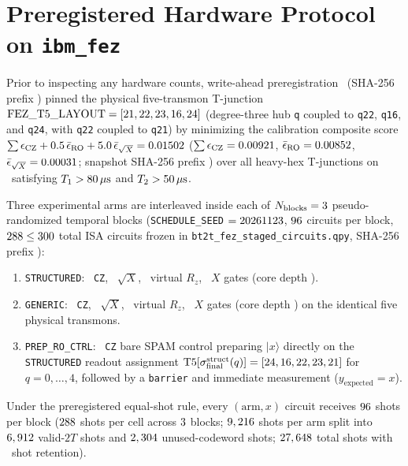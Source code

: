 \documentclass[aps,prx,twocolumn,superscriptaddress,nofootinbib]{revtex4-2}
\begin{document}
\section{Preregistered Hardware Protocol on \texttt{ibm\_fez}}
Prior to inspecting any hardware counts, write-ahead preregistration \btProtocolId\ (SHA-256 prefix \btPreregSha) pinned the physical five-transmon T-junction $\mathrm{FEZ\_T5\_LAYOUT} = [21, 22, 23, 16, 24]$ (degree-three hub \texttt{q\btHubQubit} coupled to \texttt{q22}, \texttt{q16}, and \texttt{q24}, with \texttt{q22} coupled to \texttt{q21}) by minimizing the calibration composite score $\sum \epsilon_{\mathrm{CZ}} + 0.5\,\bar{\epsilon}_{\mathrm{RO}} + 5.0\,\bar{\epsilon}_{\sqrt{X}} = 0.01502$ ($\sum \epsilon_{\mathrm{CZ}} = 0.00921$, $\bar{\epsilon}_{\mathrm{RO}} = 0.00852$, $\bar{\epsilon}_{\sqrt{X}} = 0.00031$; snapshot SHA-256 prefix \btCalSnapSha) over all heavy-hex T-junctions on \btBackend\ satisfying $T_1 > 80\,\mu\mathrm{s}$ and $T_2 > 50\,\mu\mathrm{s}$.

Three experimental arms are interleaved inside each of $N_{\mathrm{blocks}} = 3$ pseudo-randomized temporal blocks (\texttt{SCHEDULE\_SEED} $= 20261123$, $96$ circuits per block, $288 \le 300$ total ISA circuits frozen in \texttt{bt2t\_fez\_staged\_circuits.qpy}, SHA-256 prefix \btQpySha):
\begin{enumerate}
  \item \texttt{STRUCTURED}: \btStructCz\ \texttt{CZ}, \btStructSx\ $\sqrt{X}$, \btStructRz\ virtual $R_z$, \btStructX\ $X$ gates (core depth \btStructDepth).
  \item \texttt{GENERIC}: \btGenCz\ \texttt{CZ}, \btGenSx\ $\sqrt{X}$, \btGenRz\ virtual $R_z$, \btGenX\ $X$ gates (core depth \btGenDepth) on the identical five physical transmons.
  \item \texttt{PREP\_RO\_CTRL}: \btCtrlCz\ \texttt{CZ} bare SPAM control preparing $|x\rangle$ directly on the \texttt{STRUCTURED} readout assignment $\mathrm{T5}[\sigma_{\mathrm{final}}^{\mathrm{struct}}(q)] = [24, 16, 22, 23, 21]$ for $q = 0,\dots,4$, followed by a \texttt{barrier} and immediate measurement ($y_{\mathrm{expected}} = x$).
\end{enumerate}
Under the preregistered equal-shot rule, every $(\text{arm}, x)$ circuit receives $96$ shots per block ($288$ shots per cell across $3$ blocks; $9,216$ shots per arm split into $6,912$ valid-$2T$ shots and $2,304$ unused-codeword shots; $27,648$ total shots with \btShotRetentionPct\ shot retention).
\end{document}
